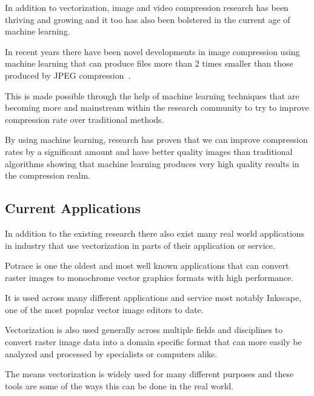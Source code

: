 \documentclass[12pt]{article}
\newcommand{\sentence}{} %
\begin{document}
    \bigskip
    In addition to vectorization, image and video compression research has been thriving and growing and it
    too has also been bolstered in the current age of machine learning.
    \sentence
    In recent years there have been novel developments in image compression using machine learning that can produce
    files more than 2 times smaller than those produced by JPEG compression~\cite{rippel2017}.
    \sentence
    This is made possible through the help of machine learning techniques that are becoming more and mainstream
    within the research community to try to improve compression rate over traditional methods.
    \sentence
    By using machine learning, research has proven that we can improve compression rates by a significant amount and
    have better quality images than traditional algorithms showing that machine learning produces very high quality
    results in the compression realm.

    \subsection{Current Applications}\label{subsec:current-applications}

    \tab
    In addition to the existing research there also exist many real world applications in industry that
    use vectorization in parts of their application or service.
    \sentence
    Potrace is one the oldest and most well known applications that can convert raster images to monochrome vector
    graphics formats with high performance\cite{noauthor_peter_nodate}.
    \sentence
    It is used across many different applications and service most notably Inkscape, one of the most popular vector
    image editors to date.
    \sentence
    Vectorization is also used generally across multiple fields and disciplines to convert raster image data into a
    domain specific format that can more easily be analyzed and processed by specialists or computers alike.
    \sentence
    The means vectorization is widely used for many different purposes and these tools are some of the ways this can
    be done in the real world.
\end{document}
